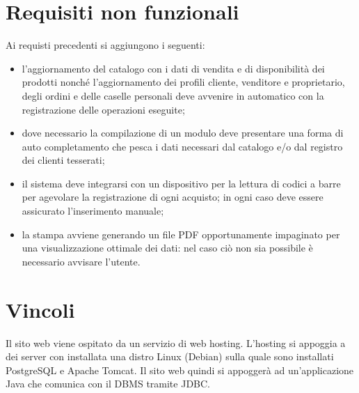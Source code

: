 \documentclass[a4paper]{scrartcl}
\begin{document}
\section*{Requisiti non funzionali}
Ai requisti precedenti si aggiungono i seguenti:
\begin{itemize}
\item l'aggiornamento del catalogo con i dati di vendita e di disponibilità dei prodotti nonché l'aggiornamento dei profili cliente, venditore e proprietario, degli ordini e delle caselle personali deve avvenire in automatico con la registrazione delle operazioni eseguite; 
\item dove necessario la compilazione di un modulo deve presentare una forma di auto completamento che pesca i dati necessari dal catalogo e/o dal registro dei clienti tesserati;
\item il sistema deve integrarsi con un dispositivo per la lettura di codici a barre per agevolare la registrazione di ogni acquisto; in ogni caso deve essere assicurato l'inserimento manuale;
\item la stampa avviene generando un file PDF opportunamente impaginato per una visualizzazione ottimale dei dati: nel caso ciò non sia possibile è necessario avvisare l'utente.
\end{itemize}

\section*{Vincoli}
Il sito web viene ospitato da un servizio di web hosting. L'hosting si appoggia a dei server con installata una distro Linux (Debian) sulla quale sono installati PostgreSQL e Apache Tomcat. Il sito web quindi si appoggerà ad un'applicazione Java che comunica con il DBMS tramite JDBC.
\end{document}
